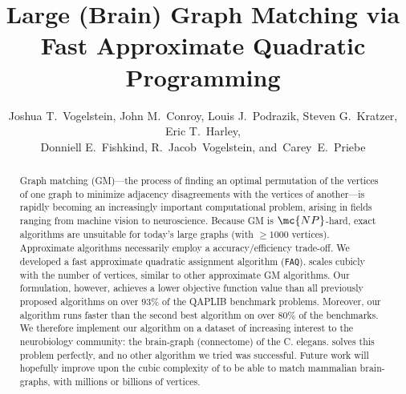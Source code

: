 \documentclass[11pt]{article}
\title{\vspace{-75pt}Large (Brain) Graph Matching via \\ Fast Approximate Quadratic Programming}
\author{Joshua T.~Vogelstein, John M.~Conroy, Louis J.~Podrazik, Steven G.~Kratzer, Eric T.~Harley, \\
        Donniell E.~Fishkind, 
		R.~Jacob~Vogelstein,
        and~Carey~E.~Priebe}
\begin{document}
\maketitle


 
\begin{abstract}
	
Graph matching (GM)---the process of finding an optimal permutation of the vertices of one graph to minimize adjacency disagreements with the vertices of another---is rapidly becoming an increasingly important computational problem, arising in fields ranging from machine vision to neuroscience. Because GM is $\mc{NP}$-hard, exact algorithms are unsuitable for today's large graphs (with $\ge 1000$ vertices). 
Approximate algorithms necessarily employ a accuracy/efficiency trade-off.
We developed a fast approximate quadratic assignment algorithm (\texttt{FAQ}). 
\FAQ scales cubicly with the number of vertices, similar to other approximate GM algorithms.  Our formulation, however, achieves a lower objective function value than all previously proposed algorithms on over $93\%$ of the QAPLIB benchmark problems.  Moreover, our algorithm runs faster than the second best algorithm on over $80\%$ of the benchmarks.  
We therefore implement our algorithm on a dataset of increasing interest to the neurobiology community: the brain-graph (connectome) of the C. elegans. \FAQ solves this problem perfectly, and no other algorithm we tried was successful.  
Future work will hopefully improve upon the cubic complexity of \FAQ to be able to match mammalian brain-graphs, with millions or billions of vertices.  
\end{abstract}
\end{document}
